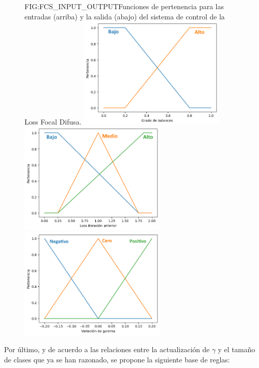 \begin{figure}[Funciones de pertenencia del FCS]{FIG:FCS_INPUT_OUTPUT}{Funciones de pertenencia para las entradas (arriba) y la salida (abajo) del sistema de control de la Loss Focal Difusa.}
    \centering
    \includegraphics[width=7cm]{img/fcs_input_1.png}
    \includegraphics[width=7cm]{img/fcs_input_2.png}
    \includegraphics[width=7cm]{img/fcs_output.png}
\end{figure}

Por último, y de acuerdo a las relaciones entre la actualización de $\gamma$ y el tamaño de clases que ya se han razonado, se propone la siguiente base de reglas:

